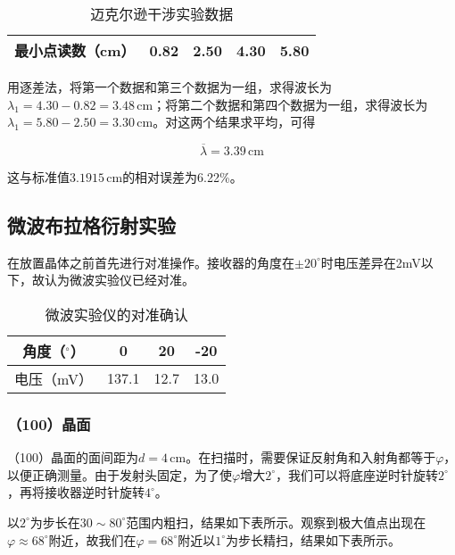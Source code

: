 \documentclass[12pt]{article}
\begin{document}
\begin{table}[h!]
    \centering
    \begin{tabular}{|c|c|c|c|c|}
        \hline
        最小点读数（cm） & 0.82 & 2.50 & 4.30 & 5.80 \\
        \hline
    \end{tabular}
    \caption{迈克尔逊干涉实验数据}
\end{table}

用逐差法，将第一个数据和第三个数据为一组，求得波长为$\lambda_1=4.30-0.82=3.48\,\mathrm{cm}$；将第二个数据和第四个数据为一组，求得波长为$\lambda_1=5.80-2.50=3.30\,\mathrm{cm}$。对这两个结果求平均，可得

\[
    \overline{\lambda}=3.39\,\mathrm{cm}
\]

这与标准值$3.1915\,\mathrm{cm}$的相对误差为6.22\%。

\subsection{微波布拉格衍射实验}
在放置晶体之前首先进行对准操作。接收器的角度在$\pm20^\circ$时电压差异在2mV以下，故认为微波实验仪已经对准。

\begin{table}[h!]
    \centering
    \begin{tabular}{|c|c|c|c|}
    \hline
    角度（$^\circ$） & 0     & 20   & -20  \\ \hline
    电压（mV）       & 137.1 & 12.7 & 13.0 \\ \hline
    \end{tabular}
    \caption{微波实验仪的对准确认}
\end{table}

\subsubsection{（100）晶面}
（100）晶面的面间距为$d=4\,\mathrm{cm}$。在扫描时，需要保证反射角和入射角都等于$\varphi$，以便正确测量。由于发射头固定，为了使$\varphi$增大$2^\circ$，我们可以将底座逆时针旋转$2^\circ$，再将接收器逆时针旋转$4^\circ$。

以$2^\circ$为步长在$30\sim80^\circ$范围内粗扫，结果如下表所示。观察到极大值点出现在$\varphi\approx68^\circ$附近，故我们在$\varphi=68^\circ$附近以$1^\circ$为步长精扫，结果如下表所示。
\end{document}
